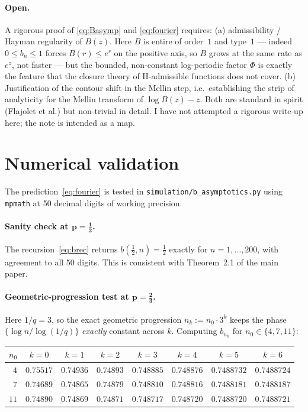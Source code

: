 \documentclass[11pt]{article}
\theoremstyle{definition}
\begin{document}
\paragraph{Open.} A rigorous proof of \eqref{eq:Basymp} and
\eqref{eq:fourier} requires: (a) admissibility / Hayman regularity of
$B(z)$. Here $B$ is entire of order~$1$ and type~$1$ --- indeed
$0\le b_n\le 1$ forces $B(r)\le e^{r}$ on the positive axis, so $B$
grows at the same rate as $e^{z}$, not faster --- but the bounded,
non-constant log-periodic factor $\Phi$ is exactly the feature that
the closure theory of H-admissible functions does not cover.
(b) Justification of the contour shift in the Mellin step, i.e.\
establishing the strip of analyticity for the Mellin transform of
$\log B(z)-z$. Both are standard in spirit (Flajolet et al.) but
non-trivial in detail. I have not attempted a rigorous write-up here;
the note is intended as a map.

\section{Numerical validation}\label{sec:numerics}

The prediction~\eqref{eq:fourier} is tested in
\texttt{simulation/b\_asymptotics.py} using \texttt{mpmath} at 50
decimal digits of working precision.

\paragraph{Sanity check at $\boldsymbol{p=\tfrac12}$.} The
recursion~\eqref{eq:brec} returns $b(\tfrac12,n)=\tfrac12$ exactly for
$n=1,\ldots,200$, with agreement to all 50 digits. This is consistent
with Theorem~2.1 of the main paper.

\paragraph{Geometric-progression test at $\boldsymbol{p=\tfrac23}$.}
Here $1/q = 3$, so the exact geometric progression $n_k := n_0 \cdot
3^k$ keeps the phase $\{\log n/\log(1/q)\}$ \emph{exactly} constant
across $k$. Computing $b_{n_k}$ for $n_0\in\{4,7,11\}$:
\medskip

\noindent
\begin{tabular}{r|ccccccc}
$n_0$ & $k=0$ & $k=1$ & $k=2$ & $k=3$ & $k=4$ & $k=5$ & $k=6$\\
\hline
$4$ & $0.75517$ & $0.74936$ & $0.74893$ & $0.748885$ & $0.748876$ & $0.7488732$ & $0.7488724$\\
$7$ & $0.74689$ & $0.74865$ & $0.74879$ & $0.748810$ & $0.748816$ & $0.7488181$ & $0.7488187$\\
$11$& $0.74890$ & $0.74869$ & $0.74871$ & $0.748717$ & $0.748720$ & $0.7488720$ & $0.7488721$\\
\end{tabular}
\medskip
\end{document}
